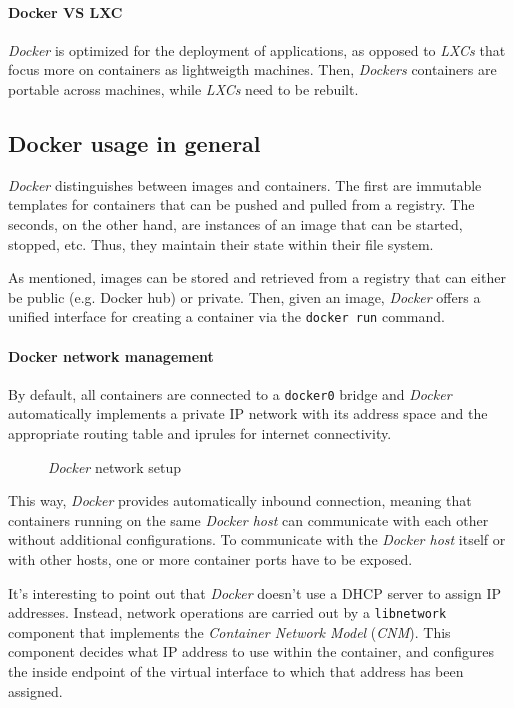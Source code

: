 \paragraph{Docker VS LXC}
\emph{Docker} is optimized for the deployment of applications, as opposed to
\emph{LXCs} that focus more on containers as lightweigth machines. Then,
\emph{Dockers} containers are portable across machines, while \emph{LXCs} need
to be rebuilt.

\subsection{Docker usage in general}
\emph{Docker} distinguishes between images and containers. The first are
immutable templates for containers that can be pushed and pulled from a registry.
The seconds, on the other hand, are instances of an image that can be started,
stopped, etc. Thus, they maintain their state within their file system.

As mentioned, images can be stored and retrieved from a registry that can
either be public (e.g. Docker hub) or private. Then, given an image, \emph{Docker}
offers a unified interface for creating a container via the \texttt{docker run}
command.

\paragraph{Docker network management}
By default, all containers are connected to a \texttt{docker0} bridge and
\emph{Docker} automatically implements a private IP network with its address
space and the appropriate routing table and iprules for internet connectivity.

\begin{figure}[h!]
    \centering
    \caption{\emph{Docker} network setup}
\end{figure}

\noindent
This way, \emph{Docker} provides automatically inbound connection, meaning that
containers running on the same \emph{Docker host} can communicate with each other
without additional configurations. To communicate with the \emph{Docker host}
itself or with other hosts, one or more container ports have to be exposed.

It's interesting to point out that \emph{Docker} doesn't use a DHCP server
to assign IP addresses. Instead, network operations are carried out by a
\texttt{libnetwork} component that implements the \emph{Container Network
Model} (\emph{CNM}). This component decides what IP address to use within the
container, and configures the inside endpoint of the virtual interface to
which that address has been assigned.

